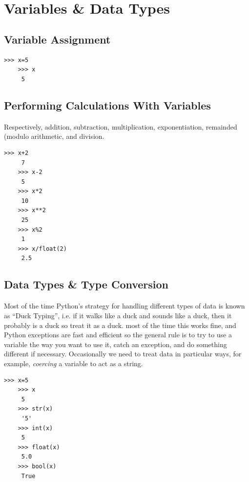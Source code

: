 \documentclass[12pt, a4paper, oneside]{book}
\begin{document}
\section{Variables \& Data Types}

\subsection{Variable Assignment}
\begin{lstlisting}[style=DOS]
    >>> x=5
    >>> x
     5
\end{lstlisting}

\subsection{Performing Calculations With Variables}
\paragraph{} Respectively, addition, subtraction, multiplication, exponentiation, remainded (modulo arithmetic, and division.
\begin{lstlisting}[style=DOS]
    >>> x+2
     7
    >>> x-2
     5
    >>> x*2
     10
    >>> x**2
     25
    >>> x%2
     1
    >>> x/float(2)
     2.5
\end{lstlisting}

\subsection{Data Types \& Type Conversion}
\paragraph{} Most of the time Python's strategy for handling different types of data is known as ``Duck Typing'', i.e. if it walks like a duck and sounds like a duck, then it probably is a duck so treat it as a duck. most of the time this works fine, and Python exceptions are fast and efficient so the general rule is to try to use a variable the way you want to use it, catch an exception, and do something different if necessary. Occasionally we need to treat data in particular ways, for example, \emph{coercing} a variable to act as a string. 

\begin{lstlisting}[style=DOS]
    >>> x=5
    >>> x
     5
    >>> str(x)
     '5'
    >>> int(x)
     5
    >>> float(x)
     5.0
    >>> bool(x)
     True
\end{lstlisting}
\end{document}
